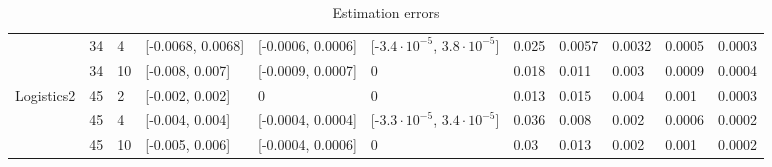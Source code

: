 \documentclass{article}
\begin{document}
\begin{table}[tbh!]
{\begin{tabular}{|l|l|l|| p{1.5cm}|p{1.5cm}|p{1.8cm}||l|l|l|l|l|}
			& 34 & 4  & [-0.0068, 0.0068]  & [-0.0006, 0.0006] & [-$3.4{\cdot} 10^{-5}$, $3.8{\cdot} 10^{-5}$] & 0.025 & 0.0057 & 0.0032 & 0.0005 & 0.0003\\ \cline{2-11}  
			& 34 & 10  & [-0.008, 0.007] & [-0.0009, 0.0007] & 0 & 0.018 & 0.011 & 0.003 &0.0009 & 0.0004\\ \hline
			\multirow{2}{*}{Logistics2} & 45 & 2 & [-0.002, 0.002] & 0& 0 & 0.013 & 0.015 & 0.004& 0.001 & 0.0003 \\ \cline{2-11}  
			& 45 & 4  & [-0.004, 0.004] & [-0.0004, 0.0004] & [-$3.3{\cdot} 10^{-5}$, $3.4{\cdot} 10^{-5}$]& 0.036 & 0.008 & 0.002 & 0.0006 &0.0002\\ \cline{2-11}  
			& 45 & 10  &[-0.005, 0.006]  & [-0.0004, 0.0006] & 0 & 0.03 & 0.013 & 0.002 &0.001 & 0.0002 \\ \hline
		\end{tabular}
		\caption{Estimation errors}
		\label{tab:errors1}
	}
\end{table}
\end{document}
